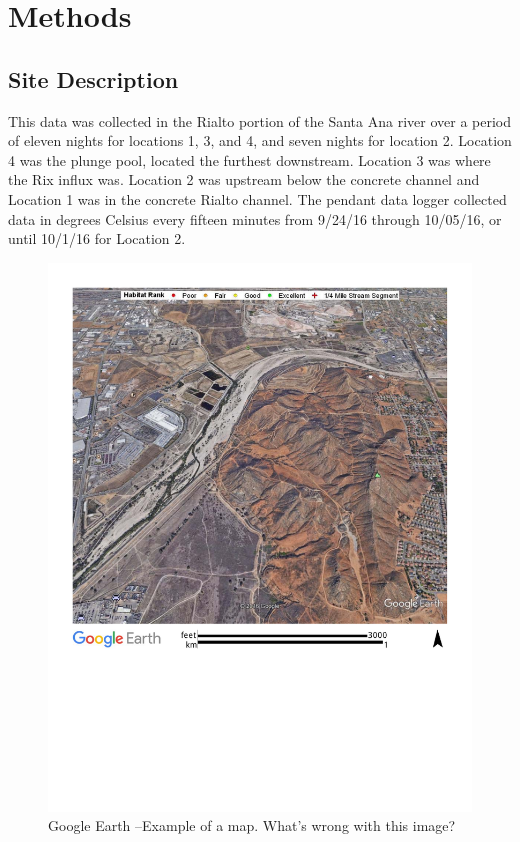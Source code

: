 \documentclass{article}\usepackage[]{graphicx}\usepackage[]{color}
\begin{document}
\section{Methods}

\subsection{Site Description}

This data was collected in the Rialto portion of the Santa Ana river over a period of eleven nights for locations 1, 3, and 4, and seven nights for location 2. Location 4 was the plunge pool, located the furthest downstream. Location 3 was where the Rix influx was. Location 2 was upstream below the concrete channel and Location 1 was in the concrete Rialto channel. The pendant data logger collected data in degrees Celsius every fifteen minutes from 9/24/16 through 10/05/16, or until 10/1/16 for Location 2. 

\begin{figure}
\includegraphics[width=1.00\textwidth]{Figures/SantaAna_SatelliteImage}
\caption{Google Earth --Example of a map. What's wrong with this image?}
\label{SAR_Image}
\end{figure}
\end{document}
